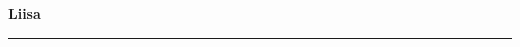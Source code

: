 \documentclass[10pt]{book}
\begin{document}
{
  \samepage
  \raggedbottom
  \raggedright
  \sloppy


  \vspace{0.2in}

  \noindent\begin{minipage}{.1\textwidth}
    \hfill\vspace{0.1in}
  \end{minipage}%
  \noindent\begin{minipage}{.8\textwidth}
    \centering
    \bfseries
    \large Liisa
  \end{minipage}%
  \noindent\begin{minipage}{.1\textwidth}
      \hfill\vspace{0.1in}
  \end{minipage}

  \nopagebreak[4]
  \vspace{0.1in}
  \nopagebreak[4]
  \hrule height 0.05ex
  \nopagebreak[4]
  \vspace{-0.05in}




}
\end{document}

